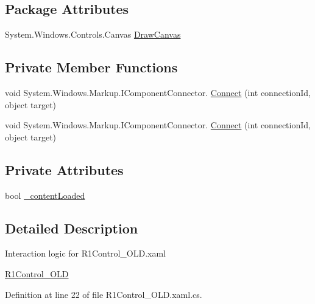 \subsection*{Package Attributes}
\begin{DoxyCompactItemize}
\item 
System.\+Windows.\+Controls.\+Canvas \hyperlink{class_c_p_u___o_s___simulator_1_1_controls_1_1_resource___controls_1_1_r1_control___o_l_d_a0fafbde2f6b6bb7679db79a6714d2dfa}{Draw\+Canvas}
\end{DoxyCompactItemize}
\subsection*{Private Member Functions}
\begin{DoxyCompactItemize}
\item 
void System.\+Windows.\+Markup.\+I\+Component\+Connector. \hyperlink{class_c_p_u___o_s___simulator_1_1_controls_1_1_resource___controls_1_1_r1_control___o_l_d_afd9b895e5501bde714c016a50adb319d}{Connect} (int connection\+Id, object target)
\item 
void System.\+Windows.\+Markup.\+I\+Component\+Connector. \hyperlink{class_c_p_u___o_s___simulator_1_1_controls_1_1_resource___controls_1_1_r1_control___o_l_d_afd9b895e5501bde714c016a50adb319d}{Connect} (int connection\+Id, object target)
\end{DoxyCompactItemize}
\subsection*{Private Attributes}
\begin{DoxyCompactItemize}
\item 
bool \hyperlink{class_c_p_u___o_s___simulator_1_1_controls_1_1_resource___controls_1_1_r1_control___o_l_d_ae43496a175858d52f31fda5a3fd2cd73}{\+\_\+content\+Loaded}
\end{DoxyCompactItemize}


\subsection{Detailed Description}
Interaction logic for R1\+Control\+\_\+\+O\+L\+D.\+xaml 

\hyperlink{class_c_p_u___o_s___simulator_1_1_controls_1_1_resource___controls_1_1_r1_control___o_l_d}{R1\+Control\+\_\+\+O\+L\+D} 

Definition at line 22 of file R1\+Control\+\_\+\+O\+L\+D.\+xaml.\+cs.



